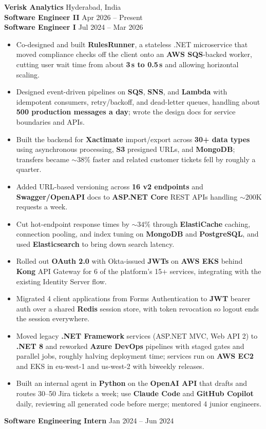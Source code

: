 \documentclass[letterpaper,10pt]{article}
\begin{document}
\textbf{Verisk Analytics} \hfill Hyderabad, India \\
\textbf{Software Engineer II} \hfill Apr 2026 -- Present \\
\textbf{Software Engineer I} \hfill Jul 2024 -- Mar 2026
\begin{itemize}
    \item Co-designed and built \textbf{RulesRunner}, a stateless .NET microservice that moved compliance checks off the client onto an \textbf{AWS SQS}-backed worker, cutting user wait time from about \textbf{3\,s to 0.5\,s} and allowing horizontal scaling.
    \item Designed event-driven pipelines on \textbf{SQS}, \textbf{SNS}, and \textbf{Lambda} with idempotent consumers, retry/backoff, and dead-letter queues, handling about \textbf{500 production messages a day}; wrote the design docs for service boundaries and APIs.
    \item Built the backend for \textbf{Xactimate} import/export across \textbf{30+ data types} using asynchronous processing, \textbf{S3} presigned URLs, and \textbf{MongoDB}; transfers became ${\sim}38\%$ faster and related customer tickets fell by roughly a quarter.
    \item Added URL-based versioning across \textbf{16 v2 endpoints} and \textbf{Swagger/OpenAPI} docs to \textbf{ASP.NET Core} REST APIs handling ${\sim}200$K requests a week.
    \item Cut hot-endpoint response times by ${\sim}34\%$ through \textbf{ElastiCache} caching, connection pooling, and index tuning on \textbf{MongoDB} and \textbf{PostgreSQL}, and used \textbf{Elasticsearch} to bring down search latency.
    \item Rolled out \textbf{OAuth 2.0} with Okta-issued \textbf{JWTs} on \textbf{AWS EKS} behind \textbf{Kong} API Gateway for 6 of the platform's 15+ services, integrating with the existing Identity Server flow.
    \item Migrated 4 client applications from Forms Authentication to \textbf{JWT} bearer auth over a shared \textbf{Redis} session store, with token revocation so logout ends the session everywhere.
    \item Moved legacy \textbf{.NET Framework} services (ASP.NET MVC, Web API 2) to \textbf{.NET 8} and reworked \textbf{Azure DevOps} pipelines with staged gates and parallel jobs, roughly halving deployment time; services run on \textbf{AWS EC2} and EKS in eu-west-1 and us-west-2 with biweekly releases.
    \item Built an internal agent in \textbf{Python} on the \textbf{OpenAI API} that drafts and routes 30--50 Jira tickets a week; use \textbf{Claude Code} and \textbf{GitHub Copilot} daily, reviewing all generated code before merge; mentored 4 junior engineers.
\end{itemize}
\textbf{Software Engineering Intern} \hfill Jan 2024 -- Jun 2024
\end{document}
